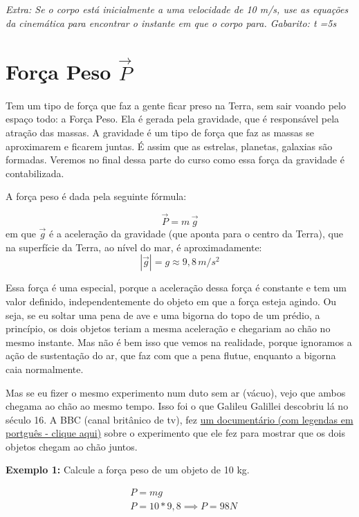 \documentclass[12pt]{extarticle}
\newcommand{\<}{\langle}
\renewcommand{\>}{\rangle}
\theoremstyle{definition}
\begin{document}
\textit{Extra: Se o corpo está inicialmente a uma velocidade de 10 m/s, use as equações da cinemática para encontrar o instante em que o corpo para. Gabarito: t =5s}
\section{Força Peso $\Vec{P}$}

Tem um tipo de força que faz a gente ficar preso na Terra, sem sair voando pelo espaço todo: a Força Peso. Ela é gerada pela gravidade, que é responsável pela atração das massas. A gravidade é um tipo de força que faz as massas se aproximarem e ficarem juntas. É assim que as estrelas, planetas, galaxias são formadas. Veremos no final dessa parte do curso como essa força da gravidade é contabilizada.

A força peso é dada pela seguinte fórmula:

\begin{equation}
    \Vec{P} = m\,\Vec{g}
\end{equation}
\noindent em que $\Vec{g}$ é a aceleração da gravidade (que aponta para o centro da Terra), que na superfície da Terra, ao nível do mar, é aproximadamente:
\begin{equation}
    |\Vec{g}| = g \approx 9,8\, m/s^2
\end{equation}

Essa força é uma especial, porque a aceleração dessa força é constante e tem um valor definido, independentemente do objeto em que a força esteja agindo. Ou seja, se eu soltar uma pena de ave e uma bigorna do topo de um prédio, a princípio, os dois objetos teriam a mesma aceleração e chegariam ao chão no mesmo instante. Mas não é bem isso que vemos na realidade, porque ignoramos a ação de sustentação do ar, que faz com que a pena flutue, enquanto a bigorna caia normalmente.

Mas se eu fizer o mesmo experimento num duto sem ar (vácuo), vejo que ambos chegama ao chão ao mesmo tempo. Isso foi o que Galileu Galillei descobriu lá no século 16. A BBC (canal britânico de tv), fez \href{https://www.youtube.com/watch?v=qSeW0f51QzY}{um documentário (com legendas em portguês - clique aqui)} sobre o  experimento que ele fez para mostrar que os dois objetos chegam ao chão juntos.

\textbf{Exemplo 1:} Calcule a força peso de um objeto de 10 kg.

\begin{align*}
    &P = mg \\
    &P = 10*9,8 \implies P=98 N
\end{align*}
\end{document}

